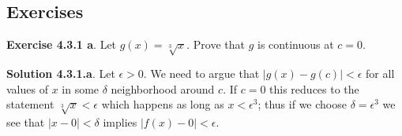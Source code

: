 \documentclass[10pt]{amsbook}
\begin{document}
\subsection{Exercises}


\textbf{Exercise 4.3.1 a}. Let $g\left(x\right) = \sqrt[3]{x}$. Prove that $g$ is continuous at $c=0$.

\textbf{Solution 4.3.1.a}. Let $\epsilon > 0$. We need to argue that $\left|g\left(x\right) - g\left(c\right)\right| < \epsilon$ for all values of $x$ in some $\delta$ neighborhood around $c$. If $c = 0$ this reduces to the statement $\sqrt[3]{x} < \epsilon$ which happens as long as $x < \epsilon^3$; thus if we choose $\delta = \epsilon^3$ we see that $\left|x-0\right| < \delta$ implies $\left|f\left(x\right) - 0\right| < \epsilon$.
\end{document}

